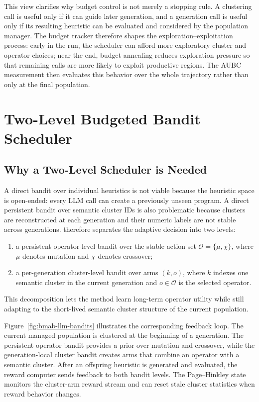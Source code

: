\documentclass[../main.tex]{subfiles}
\begin{document}
This view clarifies why budget control is not merely a stopping rule. A clustering call is useful only if it can guide later generation, and a generation call is useful only if its resulting heuristic can be evaluated and considered by the population manager. The budget tracker therefore shapes the exploration--exploitation process: early in the run, the scheduler can afford more exploratory cluster and operator choices; near the end, budget annealing reduces exploration pressure so that remaining calls are more likely to exploit productive regions. The AUBC measurement then evaluates this behavior over the whole trajectory rather than only at the final population.

\section{Two-Level Budgeted Bandit Scheduler}

\subsection{Why a Two-Level Scheduler is Needed}

A direct bandit over individual heuristics is not viable because the heuristic space is open-ended: every LLM call can create a previously unseen program. A direct persistent bandit over semantic cluster IDs is also problematic because clusters are reconstructed at each generation and their numeric labels are not stable across generations. \bmab{} therefore separates the adaptive decision into two levels:

\begin{enumerate}
  \item a persistent operator-level bandit over the stable action set $\mathcal{O}=\{\mu,\chi\}$, where $\mu$ denotes mutation and $\chi$ denotes crossover;
  \item a per-generation cluster-level bandit over arms $(k,o)$, where $k$ indexes one semantic cluster in the current generation and $o \in \mathcal{O}$ is the selected operator.
\end{enumerate}

This decomposition lets the method learn long-term operator utility while still adapting to the short-lived semantic cluster structure of the current population.

Figure~\ref{fig:bmab-llm-bandits} illustrates the corresponding feedback loop. The current managed population is clustered at the beginning of a generation. The persistent operator bandit provides a prior over mutation and crossover, while the generation-local cluster bandit creates arms that combine an operator with a semantic cluster. After an offspring heuristic is generated and evaluated, the reward computer sends feedback to both bandit levels. The Page--Hinkley state monitors the cluster-arm reward stream and can reset stale cluster statistics when reward behavior changes.
\end{document}
